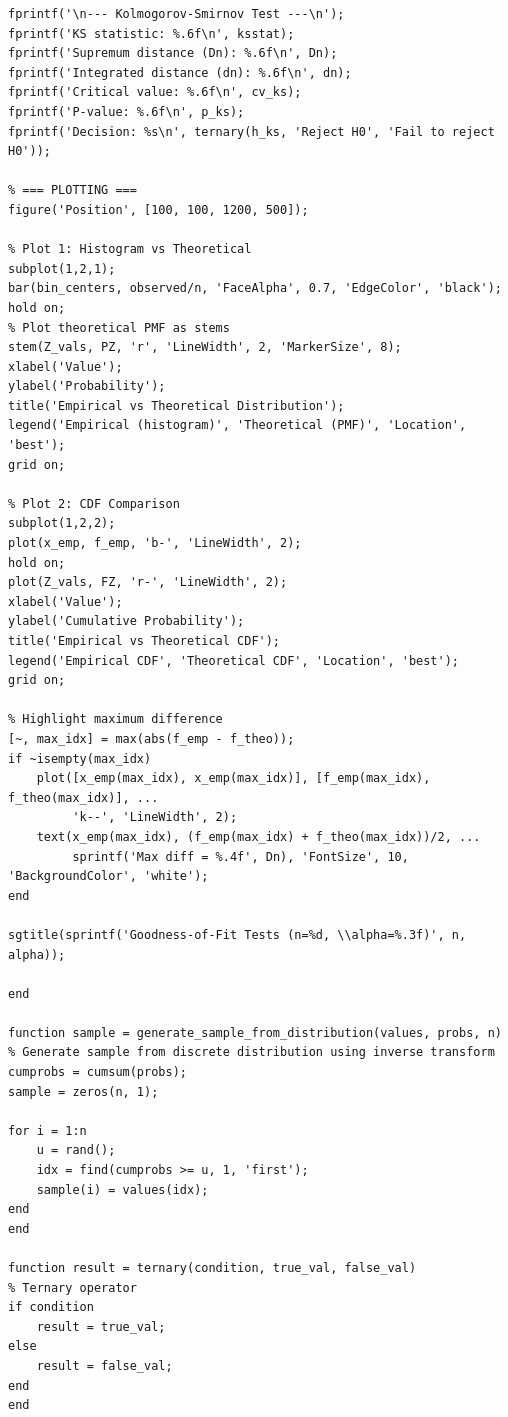 \begin{matlab}
\begin{lstlisting}
fprintf('\n--- Kolmogorov-Smirnov Test ---\n');
fprintf('KS statistic: %.6f\n', ksstat);
fprintf('Supremum distance (Dn): %.6f\n', Dn);
fprintf('Integrated distance (dn): %.6f\n', dn);
fprintf('Critical value: %.6f\n', cv_ks);
fprintf('P-value: %.6f\n', p_ks);
fprintf('Decision: %s\n', ternary(h_ks, 'Reject H0', 'Fail to reject H0'));

% === PLOTTING ===
figure('Position', [100, 100, 1200, 500]);

% Plot 1: Histogram vs Theoretical
subplot(1,2,1);
bar(bin_centers, observed/n, 'FaceAlpha', 0.7, 'EdgeColor', 'black');
hold on;
% Plot theoretical PMF as stems
stem(Z_vals, PZ, 'r', 'LineWidth', 2, 'MarkerSize', 8);
xlabel('Value');
ylabel('Probability');
title('Empirical vs Theoretical Distribution');
legend('Empirical (histogram)', 'Theoretical (PMF)', 'Location', 'best');
grid on;

% Plot 2: CDF Comparison
subplot(1,2,2);
plot(x_emp, f_emp, 'b-', 'LineWidth', 2);
hold on;
plot(Z_vals, FZ, 'r-', 'LineWidth', 2);
xlabel('Value');
ylabel('Cumulative Probability');
title('Empirical vs Theoretical CDF');
legend('Empirical CDF', 'Theoretical CDF', 'Location', 'best');
grid on;

% Highlight maximum difference
[~, max_idx] = max(abs(f_emp - f_theo));
if ~isempty(max_idx)
    plot([x_emp(max_idx), x_emp(max_idx)], [f_emp(max_idx), f_theo(max_idx)], ...
         'k--', 'LineWidth', 2);
    text(x_emp(max_idx), (f_emp(max_idx) + f_theo(max_idx))/2, ...
         sprintf('Max diff = %.4f', Dn), 'FontSize', 10, 'BackgroundColor', 'white');
end

sgtitle(sprintf('Goodness-of-Fit Tests (n=%d, \\alpha=%.3f)', n, alpha));

end

function sample = generate_sample_from_distribution(values, probs, n)
% Generate sample from discrete distribution using inverse transform
cumprobs = cumsum(probs);
sample = zeros(n, 1);

for i = 1:n
    u = rand();
    idx = find(cumprobs >= u, 1, 'first');
    sample(i) = values(idx);
end
end

function result = ternary(condition, true_val, false_val)
% Ternary operator
if condition
    result = true_val;
else
    result = false_val;
end
end
    \end{lstlisting}
\end{matlab}

